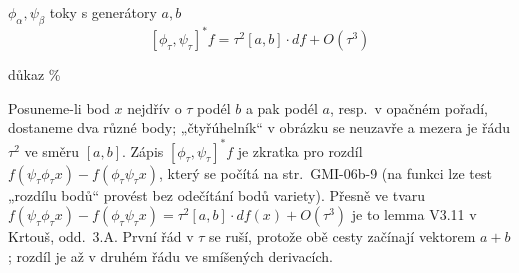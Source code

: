 \begin{minipage}{0.55\textwidth}
\begin{veta}[Tvrzení]
$\phi_\alpha,\psi_\beta$ toky s generátory $a,b$
\[
  [\phi_\tau,\psi_\tau]^*f = \tau^2[a,b]\cdot df + O(\tau^3)
\]
\end{veta}
důkaz \%
\end{minipage}
\hfill
\begin{minipage}{0.42\textwidth}
\end{minipage}

\begin{vysvetleni}
Posuneme-li bod $x$ nejdřív o $\tau$ podél $b$ a pak podél $a$, resp.\ v opačném pořadí, dostaneme dva různé body; „čtyřúhelník“ v obrázku se neuzavře a mezera je řádu $\tau^2$ ve směru $[a,b]$.
Zápis $[\phi_\tau,\psi_\tau]^*f$ je zkratka pro rozdíl $f(\psi_\tau\phi_\tau x)-f(\phi_\tau\psi_\tau x)$, který se počítá na str.~GMI-06b-9 (na funkci lze test „rozdílu bodů“ provést bez odečítání bodů variety). Přesně ve tvaru
$f(\psi_\tau\phi_\tau x)-f(\phi_\tau\psi_\tau x)=\tau^2[a,b]\cdot df(x)+O(\tau^3)$ je to lemma V3.11 v Krtouš, odd.~3.A.
První řád v $\tau$ se ruší, protože obě cesty začínají vektorem $a+b$; rozdíl je až v druhém řádu ve smíšených derivacích.
\end{vysvetleni}

